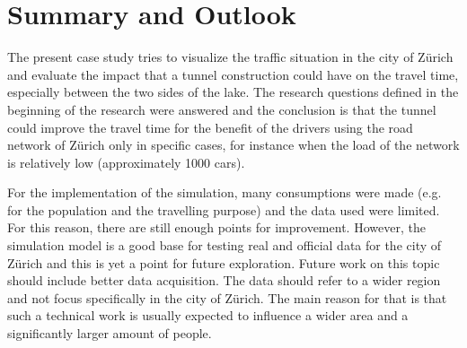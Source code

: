 \documentclass[11pt]{article}
\begin{document}
\section{Summary and Outlook}
The present case study tries to visualize the traffic situation in the city of Z\"urich and evaluate the impact that a tunnel construction could have on the travel time, especially between the two sides of the lake. The research questions defined in the beginning of the research were answered and the conclusion is that the tunnel could improve the travel time for the benefit of the drivers using the road network of Z\"urich only in specific cases, for instance when the load of the network is relatively low (approximately 1000 cars).

For the implementation of the simulation, many consumptions were made (e.g. for the population and the travelling purpose) and the data used were limited. For this reason, there are still enough points for improvement. However, the simulation model is a good base for testing real and official data for the city of Z\"urich and this is yet a point for future exploration. Future work on this topic should include better data acquisition. The data should refer to a wider region and not focus specifically in the city of Z\"urich. The main reason for that is that such a technical work is usually expected to influence a wider area and a significantly larger amount of people.




\printbibliography
\end{document}
